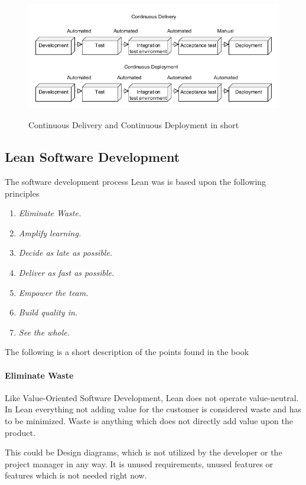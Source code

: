 \documentclass{sig-alternate}
\begin{document}
\begin{figure}
\caption{Continuous Delivery and Continuous Deployment in short}
\includegraphics[scale=0.37]{Umlet/DeliveryandDeployment}
\label{fig:deliverydeploment}
\end{figure}


\subsection{Lean Software Development}
\label{lean}
The software development process Lean \cite{poppendieck:lean} was is based upon the following principles

\begin{enumerate}
\item \textit{Eliminate Waste.}
\item \textit{Amplify learning.} 
\item \textit{Decide as late as possible.}
\item \textit{Deliver as fast as possible.}
\item \textit{Empower the team.}
\item \textit{Build quality in.} 
\item \textit{See the whole.} 
\end{enumerate}

The following is a short description of the points found in the book \cite{poppendieck:lean}

\paragraph{Eliminate Waste}
Like Value-Oriented Software Development, Lean does not operate value-neutral. 
In Lean everything not adding value for the customer is considered waste and has to be minimized.
Waste is anything which does not directly add value upon the product. 

This could be Design diagrams, which is not utilized by the developer or the project manager in any way. 
It is unused requirements, unused features or features which is not needed right now.
\end{document}
